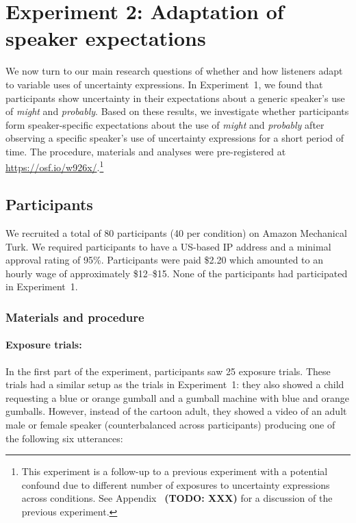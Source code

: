 \documentclass[man, floatsintext]{apa6}
\newcommand{\todo}[1]{}
\renewcommand{\todo}[1]{{\bf \color{red} (TODO: {#1})}}
\begin{document}
\section{Experiment 2: Adaptation of speaker expectations}
\label{sec:exp-prod-adaptation}

We now turn to our main research questions of whether and how listeners adapt to variable uses of uncertainty expressions.
In Experiment~1, we found that participants show uncertainty in their expectations about a generic speaker's 
use of \textit{might} and \textit{probably}. Based on these results, we investigate whether participants
form speaker-specific expectations about the use of \textit{might} and \textit{probably} after observing a specific speaker's use of 
uncertainty expressions for a short period of time. The procedure, materials and analyses were pre-registered at \url{https://osf.io/w926x/}.\footnote{This experiment is a follow-up to a previous experiment with a potential confound due to different number of exposures to uncertainty expressions across conditions. See Appendix~\todo{XXX} for a discussion of the previous experiment.}


\subsection{Participants}
We recruited a total of 80 participants (40 per condition) on Amazon Mechanical Turk. 
We required participants to have a US-based IP address and a minimal approval rating 
of 95\%. Participants were paid \$2.20 which amounted to an hourly wage of approximately 
\$12--\$15. None of the participants had participated in Experiment~1.

\subsubsection{Materials and procedure}

\paragraph{Exposure trials:} In the first part of the experiment, participants saw 25 exposure trials. 
These trials had a similar setup as the trials in Experiment~1: 
they also showed a child requesting a blue or orange gumball and a gumball machine with blue and orange gumballs. 
However, instead of the cartoon adult, they showed a video of an adult male or female speaker (counterbalanced across participants) producing one of the following six utterances:
\end{document}
